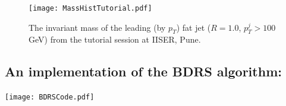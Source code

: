 \begin{figure}
	\begin{center}
		\texttt{[image: MassHistTutorial.pdf]}
		\caption{
			The invariant mass of the leading (by $p_T$) fat jet ($R=1.0$, $p_T^{j}>100$ GeV) from the tutorial session at IISER, Pune.
		}
	\end{center}
\end{figure}




\subsection{An implementation of the BDRS algorithm:}
\begin{center}
	\texttt{[image: BDRSCode.pdf]}
\end{center}
